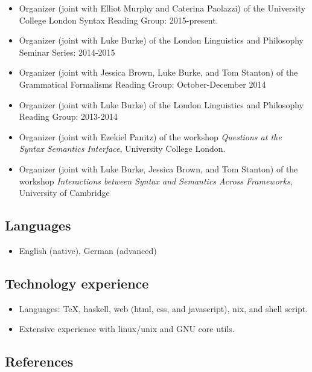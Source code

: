 \documentclass[]{article}
\providecommand{\tightlist}{%
  \setlength{\itemsep}{0pt}\setlength{\parskip}{0pt}}
\begin{document}
\begin{itemize}
  \begin{itemize}
  \tightlist
  \item
    Organizer (joint with Elliot Murphy and Caterina Paolazzi) of the
    University College London Syntax Reading Group: 2015-present.
  \item
    Organizer (joint with Luke Burke) of the London Linguistics and
    Philosophy Seminar Series: 2014-2015
  \item
    Organizer (joint with Jessica Brown, Luke Burke, and Tom Stanton) of
    the Grammatical Formalisms Reading Group: October-December 2014
  \item
    Organizer (joint with Luke Burke) of the London Linguistics and
    Philosophy Reading Group: 2013-2014
  \item
    Organizer (joint with Ezekiel Panitz) of the workshop
    \emph{Questions at the Syntax Semantics Interface}, University
    College London.
  \item
    Organizer (joint with Luke Burke, Jessica Brown, and Tom Stanton) of
    the workshop \emph{Interactions between Syntax and Semantics Across
    Frameworks}, University of Cambridge
  \end{itemize}
\end{itemize}

\subsection{Languages}\label{languages}

\begin{itemize}
\tightlist
\item
  English (native), German (advanced)
\end{itemize}

\subsection{Technology experience}\label{technology-experience}

\begin{itemize}
\tightlist
\item
  Languages: TeX, haskell, web (html, css, and javascript), nix, and
  shell script.
\item
  Extensive experience with linux/unix and GNU core utils.
\end{itemize}

\subsection{References}\label{references}
\end{document}

